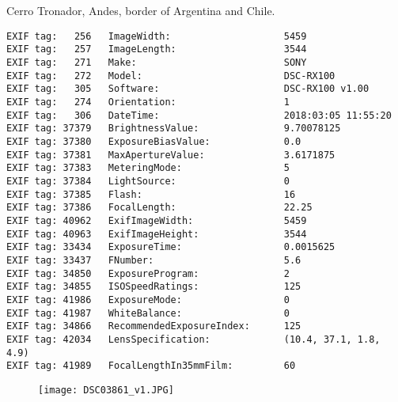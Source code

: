 \section{\protect{}}
\noindent Cerro Tronador, Andes, border of Argentina and Chile.
\noindent
\begin{lstlisting}
EXIF tag:   256   ImageWidth:                    5459
EXIF tag:   257   ImageLength:                   3544
EXIF tag:   271   Make:                          SONY
EXIF tag:   272   Model:                         DSC-RX100
EXIF tag:   305   Software:                      DSC-RX100 v1.00
EXIF tag:   274   Orientation:                   1
EXIF tag:   306   DateTime:                      2018:03:05 11:55:20
EXIF tag: 37379   BrightnessValue:               9.70078125
EXIF tag: 37380   ExposureBiasValue:             0.0
EXIF tag: 37381   MaxApertureValue:              3.6171875
EXIF tag: 37383   MeteringMode:                  5
EXIF tag: 37384   LightSource:                   0
EXIF tag: 37385   Flash:                         16
EXIF tag: 37386   FocalLength:                   22.25
EXIF tag: 40962   ExifImageWidth:                5459
EXIF tag: 40963   ExifImageHeight:               3544
EXIF tag: 33434   ExposureTime:                  0.0015625
EXIF tag: 33437   FNumber:                       5.6
EXIF tag: 34850   ExposureProgram:               2
EXIF tag: 34855   ISOSpeedRatings:               125
EXIF tag: 41986   ExposureMode:                  0
EXIF tag: 41987   WhiteBalance:                  0
EXIF tag: 34866   RecommendedExposureIndex:      125
EXIF tag: 42034   LensSpecification:             (10.4, 37.1, 1.8, 4.9)
EXIF tag: 41989   FocalLengthIn35mmFilm:         60

\end{lstlisting}
\clearpage
\begin{figure}
\raggedleft
\texttt{[image: DSC03861\_v1.JPG]}
\end{figure}


\clearpage
